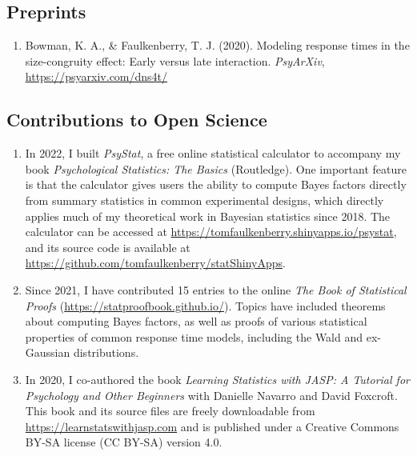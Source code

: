 \documentclass[article,10pt]{article}
\begin{document}
\subsection*{Preprints}
\label{sec:orgcd3733d}
\begin{enumerate}
\item Bowman, K. A., \& Faulkenberry, T. J. (2020). Modeling response times in the size-congruity effect: Early versus late interaction. \emph{PsyArXiv}, \url{https://psyarxiv.com/dns4t/}
\end{enumerate}
\subsection*{Contributions to Open Science}
\label{sec:org5ed769b}
\begin{enumerate}
\item In 2022, I built \emph{PsyStat}, a free online statistical calculator to accompany my book \emph{Psychological Statistics: The Basics} (Routledge). One important feature is that the calculator gives users the ability to compute Bayes factors directly from summary statistics in common experimental designs, which directly applies much of my theoretical work in Bayesian statistics since 2018. The calculator can be accessed at \url{https://tomfaulkenberry.shinyapps.io/psystat}, and its source code is available at \url{https://github.com/tomfaulkenberry/statShinyApps}.

\item Since 2021, I have contributed 15 entries to the online \emph{The Book of Statistical Proofs} (\url{https://statproofbook.github.io/}). Topics have included theorems about computing Bayes factors, as well as proofs of various statistical properties of common response time models, including the Wald and ex-Gaussian distributions.

\item In 2020, I co-authored the book \emph{Learning Statistics with JASP: A Tutorial for Psychology and Other Beginners} with Danielle Navarro and David Foxcroft. This book and its source files are freely downloadable from \url{https://learnstatswithjasp.com} and is published under a Creative Commons BY-SA license (CC BY-SA) version 4.0.
\end{enumerate}
\end{document}
